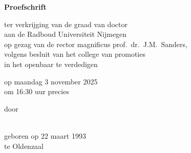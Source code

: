 \begin{titlepage}
	\begin{center}
		\vspace*{3.5cm}
		
		\huge{\bfseries\mytitle}
		
		\vspace*{15pt}
		
		\normalsize
		\myauthor
		
	\end{center}

\end{titlepage}
\newpage

\thispagestyle{empty}

\newpage

\begin{titlepage}
	\begin{center}
		\vspace*{3.5cm}
		
		\huge{\bfseries\mytitle}
		
		\vspace*{15pt}
		
		\normalsize
		
		\vspace{2.0cm}
		
		\textbf{Proefschrift}
		
		\vspace{0.5cm}
		
		ter verkrijging van de graad van doctor\\
		aan de Radboud Universiteit Nijmegen\\
		op gezag van de rector magnificus
		prof.~dr.~J.M.\ Sanders,\\
		volgens besluit van het college van promoties\\
		in het openbaar te verdedigen
		
		\vspace{0.5cm}
		
		op maandag 3 november 2025\\
		\vspace{0.2cm}
		om 16:30 uur precies
		
		\vspace{0.5cm}
		
		door
		
		\vspace{0.5cm}
		
		\textbf{\myauthor}\\
		
		geboren op 22 maart 1993\\
		te Oldenzaal
	\end{center}
\end{titlepage}


